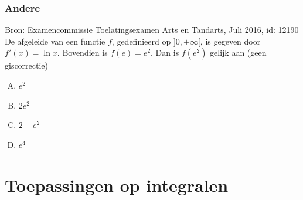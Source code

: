 \documentclass[a4paper,12pt, twoside]{article}
\begin{document}
\subsubsection{Andere}

\begin{oefening}{\scriptsize Bron: Examencommissie Toelatingsexamen Arts en Tandarts, Juli 2016, id: 12190}\\
De afgeleide van een functie $f$, gedefinieerd op $]0,+\infty[$, is gegeven door $f'(x)=\ln x$. Bovendien is $f(e)=e^2$. Dan is $f(e^2)$ gelijk aan \hfill(geen giscorrectie)
\begin{enumerate}[(A)]
  \itemsep.5em
  \item $e^2$
  \item $2e^2$
  \item $2+e^2$
  \item $e^4$
\end{enumerate}
\end{oefening}

\cleardoublepage
\section{Toepassingen op integralen}
\end{document}
